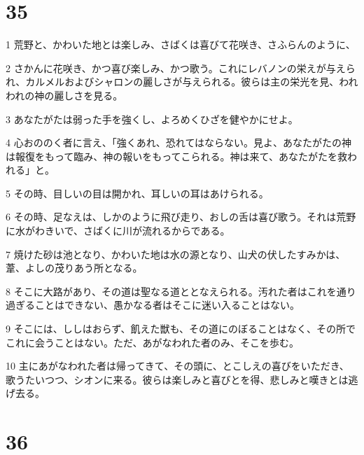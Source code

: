 \chapter{35}

\par 1 荒野と、かわいた地とは楽しみ、さばくは喜びて花咲き、さふらんのように、
\par 2 さかんに花咲き、かつ喜び楽しみ、かつ歌う。これにレバノンの栄えが与えられ、カルメルおよびシャロンの麗しさが与えられる。彼らは主の栄光を見、われわれの神の麗しさを見る。
\par 3 あなたがたは弱った手を強くし、よろめくひざを健やかにせよ。
\par 4 心おののく者に言え、「強くあれ、恐れてはならない。見よ、あなたがたの神は報復をもって臨み、神の報いをもってこられる。神は来て、あなたがたを救われる」と。
\par 5 その時、目しいの目は開かれ、耳しいの耳はあけられる。
\par 6 その時、足なえは、しかのように飛び走り、おしの舌は喜び歌う。それは荒野に水がわきいで、さばくに川が流れるからである。
\par 7 焼けた砂は池となり、かわいた地は水の源となり、山犬の伏したすみかは、葦、よしの茂りあう所となる。
\par 8 そこに大路があり、その道は聖なる道ととなえられる。汚れた者はこれを通り過ぎることはできない、愚かなる者はそこに迷い入ることはない。
\par 9 そこには、ししはおらず、飢えた獣も、その道にのぼることはなく、その所でこれに会うことはない。ただ、あがなわれた者のみ、そこを歩む。
\par 10 主にあがなわれた者は帰ってきて、その頭に、とこしえの喜びをいただき、歌うたいつつ、シオンに来る。彼らは楽しみと喜びとを得、悲しみと嘆きとは逃げ去る。

\chapter{36}

